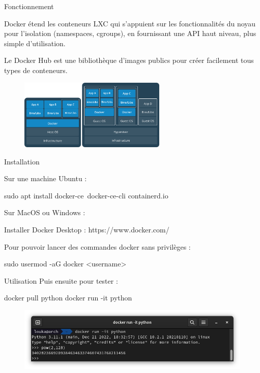 \documentclass{cubeamer}
\begin{document}
\begin{frame}{Fonctionnement}
    \begin{multicols}{2}
    Docker étend les conteneurs LXC qui s'appuient sur les fonctionnalités du noyau pour
    l'isolation (namespaces, cgroups), en fournissant une API haut niveau, plus simple
    d'utilisation.

    Le Docker Hub est une bibliothèque d'images publics pour créer facilement tous
    types de conteneurs.
    
    \columnbreak
    \begin{figure}
        \centering
        \includegraphics[width=7cm]{img/vm-container}
    \end{figure}    

    \end{multicols}
\end{frame}

\begin{frame}[fragile]{Installation}
    \begin{multicols}{2}
Sur une machine Ubuntu :
\begin{bashResized}{0.48}
sudo apt install docker-ce\
 docker-ce-cli containerd.io
\end{bashResized}
    \columnbreak
    
Sur MacOS ou Windows :
\begin{bashResized}{0.48}
Installer Docker Desktop :
https://www.docker.com/
\end{bashResized}
    \end{multicols}

    Pour pouvoir lancer des commandes docker sans privilèges :
\begin{bash}
sudo usermod -aG docker <username>
\end{bash}
\end{frame}

\begin{frame}[fragile]{Utilisation}
    Puis ensuite pour tester :
\begin{bash}
docker pull python
docker run -it python
\end{bash}

    \begin{figure}
        \centering
        \includegraphics[width=\textwidth]{img/docker-test.png}
    \end{figure}
\end{frame}
\end{document}
